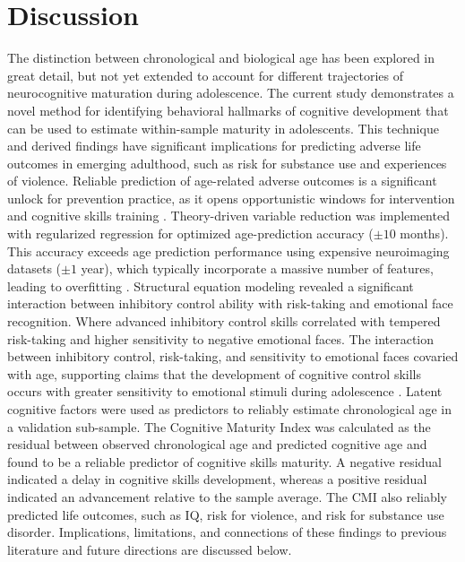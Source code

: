 \documentclass{article}%
\begin{document}
\section*{Discussion} The distinction between chronological and biological age has been explored in great detail, but not yet extended to account for different trajectories of neurocognitive maturation during adolescence. The current study demonstrates a novel method for identifying behavioral hallmarks of cognitive development that can be used to estimate within-sample maturity in adolescents. This technique and derived findings have significant implications for predicting adverse life outcomes in emerging adulthood, such as risk for substance use and experiences of violence. Reliable prediction of age-related adverse outcomes is a significant unlock for prevention practice, as it opens opportunistic windows for intervention and cognitive skills training \citep{dorn2019conceptualizing, lipsey2010improving}. Theory-driven variable reduction was implemented with regularized regression for optimized age-prediction accuracy ($\pm 10$ months). This accuracy exceeds age prediction performance using expensive neuroimaging datasets ($\pm1$ year), which typically incorporate a massive number of features, leading to overfitting \citep{cole2017predicting, franke2012brain}. Structural equation modeling revealed a significant interaction between inhibitory control ability with risk-taking and emotional face recognition. Where advanced inhibitory control skills correlated with tempered risk-taking and higher sensitivity to negative emotional faces. The interaction between inhibitory control, risk-taking, and sensitivity to emotional faces covaried with age, supporting claims that the development of cognitive control skills occurs with greater sensitivity to emotional stimuli during adolescence \citep{casey2019development}. Latent cognitive factors were used as predictors to reliably estimate chronological age in a validation sub-sample. The Cognitive Maturity Index was calculated as the residual between observed chronological age and predicted cognitive age and found to be a reliable predictor of cognitive skills maturity. A negative residual indicated a delay in cognitive skills development, whereas a positive residual indicated an advancement relative to the sample average. The CMI also reliably predicted life outcomes, such as IQ, risk for violence, and risk for substance use disorder. Implications, limitations, and connections of these findings to previous literature and future directions are discussed below.
%
\end{document}
